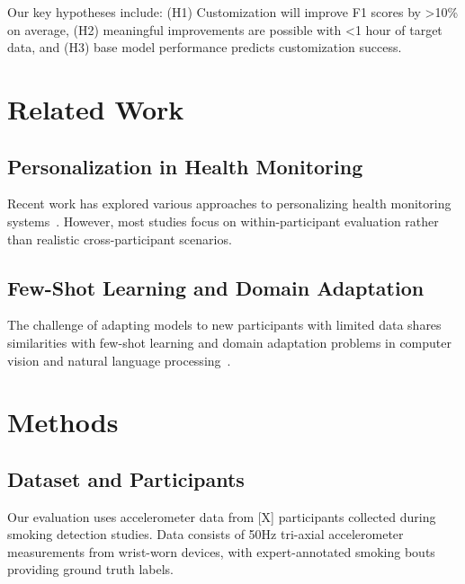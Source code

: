 \documentclass[twocolumn]{article}
\begin{document}
Our key hypotheses include: (H1) Customization will improve F1 scores by >10\% on average, (H2) meaningful improvements are possible with <1 hour of target data, and (H3) base model performance predicts customization success.

\section{Related Work}
\label{sec:related}


\subsection{Personalization in Health Monitoring}
Recent work has explored various approaches to personalizing health monitoring systems~\cite{TODO:health_personalization}. However, most studies focus on within-participant evaluation rather than realistic cross-participant scenarios.

\subsection{Few-Shot Learning and Domain Adaptation}
The challenge of adapting models to new participants with limited data shares similarities with few-shot learning and domain adaptation problems in computer vision and natural language processing~\cite{TODO:few_shot_learning}.

\section{Methods}
\label{sec:methods}


\subsection{Dataset and Participants}
Our evaluation uses accelerometer data from [X] participants collected during smoking detection studies. Data consists of 50Hz tri-axial accelerometer measurements from wrist-worn devices, with expert-annotated smoking bouts providing ground truth labels.
\end{document}

